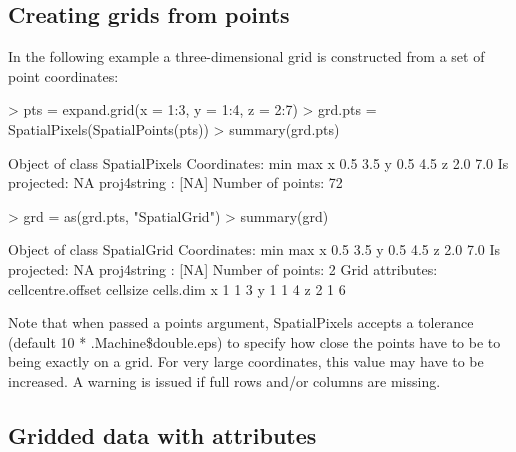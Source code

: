 \documentclass{article}
\begin{document}
\subsection{Creating grids from points}
In the following example a three-dimensional grid is constructed from
a set of point coordinates:
\begin{Schunk}
\begin{Sinput}
> pts = expand.grid(x = 1:3, y = 1:4, z = 2:7)
> grd.pts = SpatialPixels(SpatialPoints(pts))
> summary(grd.pts)
\end{Sinput}
\begin{Soutput}
Object of class SpatialPixels
Coordinates:
  min max
x 0.5 3.5
y 0.5 4.5
z 2.0 7.0
Is projected: NA 
proj4string : [NA]
Number of points: 72
\end{Soutput}
\begin{Sinput}
> grd = as(grd.pts, "SpatialGrid")
> summary(grd)
\end{Sinput}
\begin{Soutput}
Object of class SpatialGrid
Coordinates:
  min max
x 0.5 3.5
y 0.5 4.5
z 2.0 7.0
Is projected: NA 
proj4string : [NA]
Number of points: 2
Grid attributes:
  cellcentre.offset cellsize cells.dim
x                 1        1         3
y                 1        1         4
z                 2        1         6
\end{Soutput}
\end{Schunk}
Note that when passed a points argument, SpatialPixels accepts a tolerance
(default 10 * .Machine\$double.eps) to specify how close the points have
to be to being exactly on a grid. For very large coordinates, this value
may have to be increased. A warning is issued if full rows and/or columns
are missing.

\subsection{Gridded data with attributes}
\end{document}
